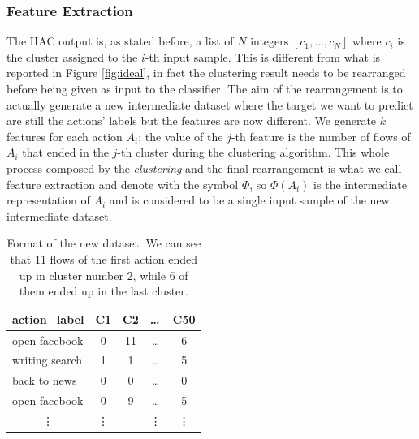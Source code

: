 \subsubsection{Feature Extraction}
\label{subsubsec:fexc}
The HAC output is, as stated before, a list of $N$ integers $[c_1,\dots, c_N]$ where $c_i$ is the cluster assigned to the $i$-th input sample. This is different from what is reported in Figure \ref{fig:ideal}, in fact the clustering result needs to be rearranged before being given as input to the classifier. The aim of the rearrangement is to actually generate a new intermediate dataset where the target we want to predict are still the actions' labels but the features are now different. We generate $k$ features for each action $A_i$; the value of the $j$-th feature is the number of flows of $A_i$ that ended in the $j$-th cluster during the clustering algorithm. This whole process composed by the \textit{clustering} and the final rearrangement is what we call feature extraction and denote with the symbol $\Phi$, so $\Phi(A_i)$ is the intermediate representation of $A_i$ and is considered to be a single input sample of the new intermediate dataset.

\begin{table}[]
\label{tab:newdataset}
\centering
\begin{tabular}{@{}lcccc@{}}
\toprule
\textbf{action\_label}     & \multicolumn{1}{l}{\textbf{C1}} & \multicolumn{1}{l}{\textbf{C2}} & \multicolumn{1}{l}{\textbf{\dots}} & \multicolumn{1}{l}{\textbf{C50}} \\ \midrule
open facebook              & 0                               & 11                              & \dots                              & 6                                \\
writing search             & 1                               & 1                               & \dots                              & 5                                \\
back to news               & 0                               & 0                               & \dots                              & 0                                \\
open facebook              & 0                               & 9                               & \dots                              & 5                                \\
\multicolumn{1}{c}{\vdots} & \vdots                          &                                 & \vdots                             & \vdots                           \\ \bottomrule
\end{tabular}
\caption{\small{Format of the new dataset. We can see that 11 flows of the first action ended up in cluster number 2, while 6 of them ended up in the last cluster.}}
\end{table}

